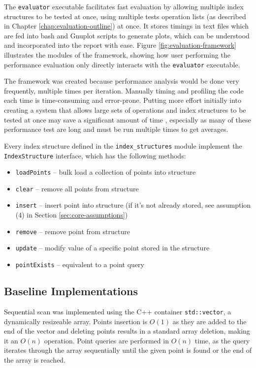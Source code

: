 The \texttt{evaluator} executable facilitates fast evaluation by allowing multiple index structures to be tested at once, using multiple tests operation lists (as described in Chapter \ref{chap:evaluation-outline}) at once. It stores timings in text files which are fed into bash and Gnuplot scripts to generate plots, which can be understood and incorporated into the report with ease. Figure \ref{fig:evaluation-framework} illustrates the modules of the framework, showing how user performing the performance evaluation only directly interacts with the \texttt{evaluator} executable.

The framework was created because performance analysis would be done very frequently, multiple times per iteration. Manually timing and profiling the code each time is time-consuming and error-prone. Putting more effort initially into creating a system that allows large sets of operations and index structures to be tested at once may save a significant amount of time , especially as many of these performance test are long and must be run multiple times to get averages.

Every index structure defined in the \texttt{index\_structures} module implement the \texttt{IndexStructure} interface, which has the following methods:
\begin{itemize}
	\item \texttt{loadPoints} -- bulk load a collection of points into structure
	\item \texttt{clear} -- remove all points from structure
	\item \texttt{insert} -- insert point into structure (if it's not already stored, see assumption (4) in Section \ref{sec:core-assumptions})
	\item \texttt{remove} -- remove point from structure
	\item \texttt{update} -- modify value of a specific point stored in the structure
	\item \texttt{pointExists} -- equivalent to a point query
\end{itemize}

\subsection{Baseline Implementations}
 
Sequential scan was implemented using the C++ container \texttt{std::vector}, a dynamically resizeable array. Points insertion is $O(1)$ as they are added to the end of the vector and deleting points results in a standard array deletion, making it an $O(n)$ operation. Point queries are performed in $O(n)$ time, as the query iterates through the array sequentially until the given point is found or the end of the array is reached.


